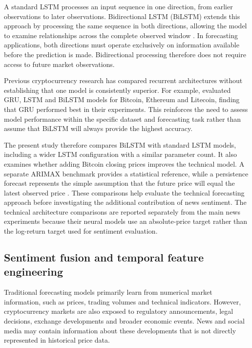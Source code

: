 A standard LSTM processes an input sequence in one direction, from earlier observations to later observations. Bidirectional LSTM (BiLSTM) extends this approach by processing the same sequence in both directions, allowing the model to examine relationships across the complete observed window \citep{Schuster1997}. In forecasting applications, both directions must operate exclusively on information available before the prediction is made. Bidirectional processing therefore does not require access to future market observations.

Previous cryptocurrency research has compared recurrent architectures without establishing that one model is consistently superior. For example, \citet{Hamayel2021} evaluated GRU, LSTM and BiLSTM models for Bitcoin, Ethereum and Litecoin, finding that GRU performed best in their experiments. This reinforces the need to assess model performance within the specific dataset and forecasting task rather than assume that BiLSTM will always provide the highest accuracy.

The present study therefore compares BiLSTM with standard LSTM models, including a wider LSTM configuration with a similar parameter count. It also examines whether adding Bitcoin closing prices improves the technical model. A separate ARIMAX benchmark provides a statistical reference, while a persistence forecast represents the simple assumption that the future price will equal the latest observed price \citep{Hyndman2021}. These comparisons help evaluate the technical forecasting approach before investigating the additional contribution of news sentiment. The technical architecture comparisons are reported separately from the main news experiments because their neural models use an absolute-price target rather than the log-return target used for sentiment evaluation.

\subsection{Sentiment fusion and temporal feature engineering}\label{sec:related_sentiment}

Traditional forecasting models primarily learn from numerical market information, such as prices, trading volumes and technical indicators. However, cryptocurrency markets are also exposed to regulatory announcements, legal decisions, exchange developments and broader economic events. News and social media may contain information about these developments that is not directly represented in historical price data.

